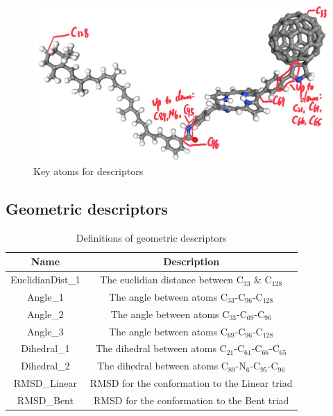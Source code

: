 \documentclass[a4paper]{article}
\begin{document}
\begin{figure}[H]
    \centering
    \includegraphics[width=0.75\linewidth]{projects/Gustave_Li/Docs/Key-atoms.jpg}
    \caption{Key atoms for descriptors}
    \label{fig:key_atoms}
\end{figure}

\subsection{Geometric descriptors}
\begin{table}[ht]
    \centering
    \caption{Definitions of geometric descriptors}
    \begin{tabular}{c|c}
    \hline \hline
       \textbf{Name}  & \textbf{Description} \\
       \hline \hline
       EuclidianDist\_1 & The euclidian distance between \(\text{C}_{33}\) \& \(\text{C}_{128}\) \\
       Angle\_1 & The angle between atoms \(\text{C}_{33}\)-\(\text{C}_{96}\)-\(\text{C}_{128}\) \\
       Angle\_2 & The angle between atoms \(\text{C}_{33}\)-\(\text{C}_{69}\)-\(\text{C}_{96}\) \\
       Angle\_3 & The angle between atoms \(\text{C}_{69}\)-\(\text{C}_{96}\)-\(\text{C}_{128}\) \\
       Dihedral\_1 & The dihedral between atoms \(\text{C}_{21}\)-\(\text{C}_{61}\)-\(\text{C}_{66}\)-\(\text{C}_{65}\) \\
       Dihedral\_2 & The dihedral between atoms \(\text{C}_{89}\)-\(\text{N}_{6}\)-\(\text{C}_{95}\)-\(\text{C}_{96}\) \\
       RMSD\_Linear & RMSD for the conformation to the Linear triad \\
       RMSD\_Bent & RMSD for the conformation to the Bent triad \\
       \hline \hline
    \end{tabular}
    
    \label{tab:descriptors}
\end{table}
\end{document}
